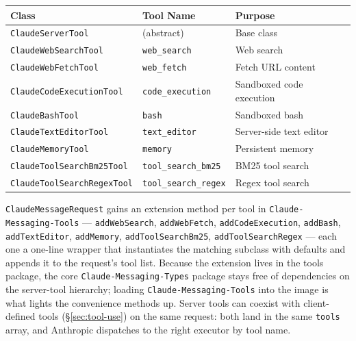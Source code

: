 \documentclass[a4paper,10pt,fleqn]{article}
\newcommand{\pkg}[1]{\texttt{#1}}
\begin{document}
\begin{center}
\begin{tabular}{@{}llp{5cm}@{}}
\toprule
\textbf{Class} & \textbf{Tool Name} & \textbf{Purpose} \\
\midrule
\texttt{ClaudeServerTool}          & (abstract)                  & Base class \\
\texttt{ClaudeWebSearchTool}       & \texttt{web\_search}        & Web search \\
\texttt{ClaudeWebFetchTool}        & \texttt{web\_fetch}         & Fetch URL content \\
\texttt{ClaudeCodeExecutionTool}   & \texttt{code\_execution}    & Sandboxed code execution \\
\texttt{ClaudeBashTool}            & \texttt{bash}               & Sandboxed bash \\
\texttt{ClaudeTextEditorTool}      & \texttt{text\_editor}       & Server-side text editor \\
\texttt{ClaudeMemoryTool}          & \texttt{memory}             & Persistent memory \\
\texttt{ClaudeToolSearchBm25Tool}  & \texttt{tool\_search\_bm25} & BM25 tool search \\
\texttt{ClaudeToolSearchRegexTool} & \texttt{tool\_search\_regex} & Regex tool search \\
\bottomrule
\end{tabular}
\end{center}

\begin{sloppypar}
\texttt{ClaudeMessageRequest} gains an extension method per tool
in \pkg{Claude-Messaging-Tools} --- \texttt{addWebSearch},
\texttt{addWebFetch}, \texttt{addCodeExecution}, \texttt{addBash},
\texttt{addTextEditor}, \texttt{addMemory},
\texttt{addToolSearchBm25}, \texttt{addToolSearchRegex} --- each
one a one-line wrapper that instantiates the matching subclass
with defaults and appends it to the request's tool list.
Because the extension lives in the tools package, the core
\texttt{Claude-Messaging-Types} package stays free of dependencies
on the server-tool hierarchy; loading
\pkg{Claude-Messaging-Tools} into the image is what lights the
convenience methods up.  Server tools can coexist with
client-defined tools (\S\ref{sec:tool-use}) on the same request:
both land in the same \texttt{tools} array, and Anthropic
dispatches to the right executor by tool name.
\end{sloppypar}
\end{document}

